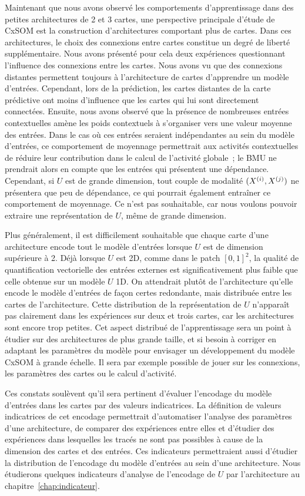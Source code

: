 \documentclass[../main]{subfiles}
\begin{document}
Maintenant que nous avons observé les comportements d'apprentissage dans des petites architectures de 2 et 3 cartes, une perspective principale d'étude de CxSOM est la construction d'architectures comportant plus de cartes.
Dans ces architectures, le choix des connexions entre cartes constitue un degré de liberté supplémentaire.
Nous avons présenté pour cela deux expériences questionnant l'influence des connexions entre les cartes.
Nous avons vu que des connexions distantes permettent toujours à l'architecture de cartes d'apprendre un modèle d'entrées. Cependant, lors de la prédiction, les cartes distantes de la carte prédictive ont moins d'influence que les cartes qui lui sont directement connectées.
Ensuite, nous avons observé que la présence de nombreuses entrées contextuelles amène les poids contextuels à s'organiser vers une valeur moyenne des entrées. Dans le cas où ces entrées seraient indépendantes au sein du modèle d'entrées, ce comportement de moyennage permettrait aux activités contextuelles de réduire leur contribution dans le calcul de l'activité globale~; le BMU ne prendrait alors en compte que les entrées qui présentent une dépendance.
Cependant, si $U$ est de grande dimension, tout couple de modalité $(X^{({i})}, X^{({j})})$ ne présentera que peu de dépendance, ce qui pourrait également entraîner ce comportement de moyennage. Ce n'est pas souhaitable, car nous voulons pouvoir extraire une représentation de $U$, même de grande dimension.

Plus généralement, il est difficilement souhaitable que chaque carte d'une architecture encode tout le modèle d'entrées lorsque $U$ est de dimension supérieure à 2.
Déjà lorsque $U$ est 2D, comme dans le patch $[0,1]^2$, la qualité de quantification vectorielle des entrées externes est significativement plus faible que celle obtenue sur un modèle $U$ 1D.
On attendrait plutôt de l'architecture qu'elle encode le modèle d'entrées de façon certes redondante, mais distribuée entre les cartes de l'architecture.
Cette distribution de la représentation de $U$ n'apparaît pas clairement dans les expériences sur deux et trois cartes, car les architectures sont encore trop petites. 
Cet aspect distribué de l'apprentissage sera un point à étudier sur des architectures de plus grande taille, et si besoin à corriger en adaptant les paramètres du modèle pour envisager un développement du modèle CxSOM à grande échelle. 
Il sera par exemple possible de jouer sur les connexions, les paramètres des cartes ou le calcul d'activité.

Ces constats soulèvent qu'il sera pertinent d'évaluer l'encodage du modèle d'entrées dans les cartes par des valeurs indicatrices.
La définition de valeurs indicatrices de cet encodage permettrait d'automatiser l'analyse des paramètres d'une architecture, de comparer des expériences entre elles et d'étudier des expériences dans lesquelles les tracés ne sont pas possibles à cause de la dimension des cartes et des entrées.
Ces indicateurs permettraient aussi d'étudier la distribution de l'encodage du modèle d'entrées au sein d'une architecture.
Nous étudierons quelques indicateurs d'analyse de l'encodage de $U$ par l'architecture au chapitre~\ref{chap:indicateur}.
\end{document}
